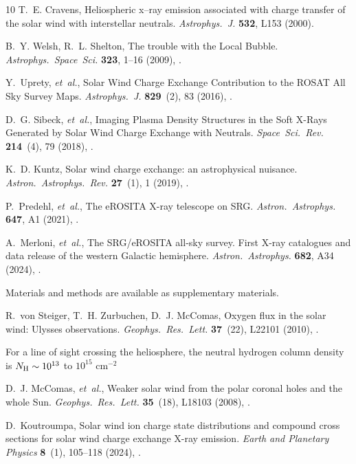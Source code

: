 \documentclass[12pt]{article}
\newcommand*\aap{Astron.~Astrophys.}
\newcommand*\aapr{Astron.~Astrophys.~Rev.}
\newcommand*\apj{Astrophys.~J.}
\newcommand*\apss{Astrophys.~Space~Sci.}
\newcommand*\grl{Geophys.~Res.~Lett.}
\newcommand*\ssr{Space~Sci.~Rev.}
\begin{document}
\begin{thebibliography}{10}
T.~E. Cravens, Heliospheric x--ray emission associated with charge transfer of
  the solar wind with interstellar neutrals. \emph{\apj} \textbf{532}, L153
  (2000).

B.~Y. {Welsh}, R.~L. {Shelton}, {The trouble with the Local Bubble}.
  \emph{\apss} \textbf{323}, 1--16 (2009), .

Y.~{Uprety}, \emph{et~al.}, {Solar Wind Charge Exchange Contribution to the
  ROSAT All Sky Survey Maps}. \emph{\apj} \textbf{829}~(2), 83 (2016),
  .

D.~G. {Sibeck}, \emph{et~al.}, {Imaging Plasma Density Structures in the Soft
  X-Rays Generated by Solar Wind Charge Exchange with Neutrals}. \emph{\ssr}
  \textbf{214}~(4), 79 (2018), .

K.~D. {Kuntz}, {Solar wind charge exchange: an astrophysical nuisance}.
  \emph{\aapr} \textbf{27}~(1), 1 (2019), .

P.~{Predehl}, \emph{et~al.}, {The eROSITA X-ray telescope on SRG}. \emph{\aap}
  \textbf{647}, A1 (2021), .

A.~{Merloni}, \emph{et~al.}, {The SRG/eROSITA all-sky survey. First X-ray
  catalogues and data release of the western Galactic hemisphere}. \emph{\aap}
  \textbf{682}, A34 (2024), .

Materials and methods are available as supplementary materials.

R.~{von Steiger}, T.~H. {Zurbuchen}, D.~J. {McComas}, {Oxygen flux in the solar
  wind: Ulysses observations}. \emph{\grl} \textbf{37}~(22), L22101 (2010),
  .

For a line of sight crossing the heliosphere, the neutral hydrogen column density is $N_{\rm H}\sim10^{13}$ to $10^{15}\mbox{ cm}^{-2}$

D.~J. {McComas}, \emph{et~al.}, {Weaker solar wind from the polar coronal holes
  and the whole Sun}. \emph{\grl} \textbf{35}~(18), L18103 (2008),
  .

D.~{Koutroumpa}, {Solar wind ion charge state distributions and compound cross
  sections for solar wind charge exchange X-ray emission}. \emph{Earth and
  Planetary Physics} \textbf{8}~(1), 105--118 (2024),
  .


\end{thebibliography}
\end{document}

